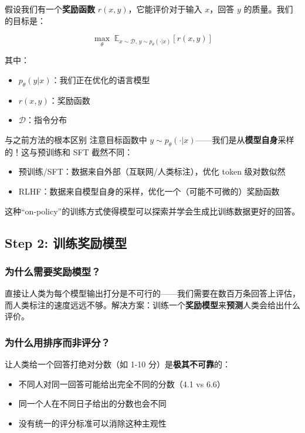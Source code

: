 \documentclass[a4paper]{article}
\begin{document}
假设我们有一个\textbf{奖励函数} $r(x, y)$，它能评价对于输入 $x$，回答 $y$ 的质量。我们的目标是：

$$\max_\theta \; \mathbb{E}_{x \sim \mathcal{D}, \, y \sim p_\theta(\cdot|x)} \left[ r(x, y) \right]$$

其中：
\begin{itemize}
    \item $p_\theta(y|x)$：我们正在优化的语言模型
    \item $r(x, y)$：奖励函数
    \item $\mathcal{D}$：指令分布
\end{itemize}





\begin{knowledgebox}{与之前方法的根本区别}
注意目标函数中 $y \sim p_\theta(\cdot|x)$——我们是从\textbf{模型自身}采样的！这与预训练和 SFT 截然不同：
\begin{itemize}
    \item 预训练/SFT：数据来自外部（互联网/人类标注），优化 token 级对数似然
    \item RLHF：数据来自模型自身的采样，优化一个（可能不可微的）奖励函数
\end{itemize}
这种``on-policy''的训练方式使得模型可以探索并学会生成比训练数据更好的回答。
\end{knowledgebox}

\subsection{Step 2: 训练奖励模型}

\subsubsection{为什么需要奖励模型？}

直接让人类为每个模型输出打分是不可行的——我们需要在数百万条回答上评估，而人类标注的速度远远不够。解决方案：训练一个\textbf{奖励模型}来\textbf{预测}人类会给出什么评价。

\subsubsection{为什么用排序而非评分？}





让人类给一个回答打绝对分数（如 1-10 分）是\textbf{极其不可靠}的：
\begin{itemize}
    \item 不同人对同一回答可能给出完全不同的分数（4.1 vs 6.6）
    \item 同一个人在不同日子给出的分数也会不同
    \item 没有统一的评分标准可以消除这种主观性
\end{itemize}
\end{document}
